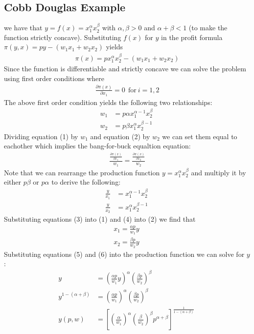 \documentclass{article}
\begin{document}
\subsection{Cobb Douglas Example}
we have that $y = f(x) = x_{1}^{\alpha} x_{2}^{\beta}$ with $\alpha, \beta > 0$ and $\alpha + \beta < 1$ (to make the function strictly concave). Substituting $f(x)$ for $y$ in the profit formula $\pi(y, x) = py - (w_{1}x_{1} + w_{2}x_{2})$ yields
\begin{gather*}
  \pi(x) = px_{1}^{\alpha}x_{2}^{\beta} - (w_{1}x_{1} + w_{2}x_{2})
\end{gather*}
Since the function is differentiable and strictly concave we can solve the problem using first order conditions where
\begin{gather*}
  \frac{\partial \pi (x)}{\partial x_{1}} = 0 \ \ \text{for} \ i = 1,2
\end{gather*}
The above first order condition yields the following two relationships:
\begin{align*}
  w_{1} &= p \alpha x_{1}^{\alpha - 1}x_{2}^{\beta} \ \tag{1} \\
  w_{2} &= p \beta x_{1}^{\alpha}x_{2}^{\beta - 1} \ \tag{2}
\end{align*}
Dividing equation (1) by $w_{1}$ and equation (2) by $w_{2}$ we can set them equal to eachother which implies the bang-for-buck equaltion equation:
\begin{gather*}
  \frac{\tfrac{\partial \pi(x)}{\partial x_{1}}}{w_{1}} = \frac{\tfrac{\partial \pi(x)}{\partial x_{2}}}{w_{2}}
\end{gather*}
Note that we can rearrange the production function $y = x_{1}^{\alpha} x_{2}^{\beta}$ and multiply it by either $p \beta$ or $p \alpha$ to derive the following:
\begin{align*}
  \frac{y}{x_{1}} &= x_{1}^{\alpha - 1} x_{2}^{\beta} \ \tag{3} \\
  \frac{y}{x_{2}} &= x_{1}^{\alpha}x_{2}^{\beta-1} \ \tag{4}
\end{align*}
Substituting equations (3) into (1) and (4) into (2) we find that
\begin{align*}
  x_{1} = \frac{\alpha p}{w_{1}}y \ \tag{5} \\
  x_{2} = \frac{\beta p}{w_{2}}y \ \tag{6}
\end{align*}
Substituting equations (5) and (6) into the production function we can solve for $y$:
\begin{align*}
  y &= (\frac{\alpha p}{w_{1}}y)^{\alpha} (\frac{\beta p}{w_{2}})^{\beta} \\
  y^{1-(\alpha + \beta)} &= (\frac{\alpha p}{w_{1}})^{\alpha} (\frac{\beta p}{w_{2}})^{\beta} \\
  y(p,w) &= [(\frac{\alpha}{w_{1}})^{\alpha}(\frac{\beta}{w_{2}})^{\beta} p^{\alpha + \beta}]^{\tfrac{1}{1 - (\alpha + \beta)}} \ \tag{7}
\end{align*}
\end{document}
